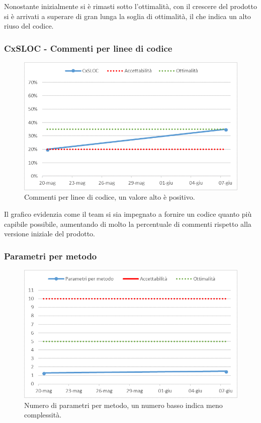 Nonostante inizialmente si è rimasti sotto l'ottimalità, con il crescere del prodotto si è arrivati a superare di gran lunga la soglia di ottimalità, il che indica un alto riuso del codice. 

\subsubsection{CxSLOC - Commenti per linee di codice}

\begin{figure}[h!]
	\centering
	\includegraphics[scale=0.75]{img/Grafici/CxSLOC.png}
	\caption{Commenti per linee di codice, un valore alto è positivo.}
	\label{fig:CxSLOC}
\end{figure}

Il grafico evidenzia come il team si sia impegnato a fornire un codice quanto più capibile possibile, aumentando di molto la percentuale di commenti rispetto alla versione iniziale del prodotto.

\newpage

\subsubsection{Parametri per metodo}

\begin{figure}[h!]
	\centering
	\includegraphics[scale=0.75]{img/Grafici/param_metodo.png}
	\caption{Numero di parametri per metodo, un numero basso indica meno complessità.}
	\label{fig:param_metodo}
\end{figure}


